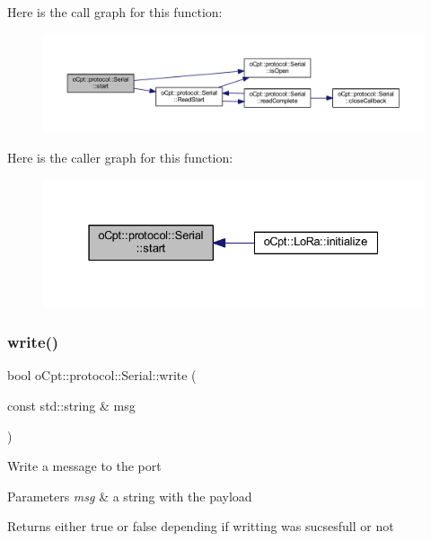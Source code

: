 Here is the call graph for this function\+:\nopagebreak
\begin{figure}[H]
\begin{center}
\leavevmode
\includegraphics[width=350pt]{classo_cpt_1_1protocol_1_1_serial_a6231948447729037b55df7531065749f_cgraph}
\end{center}
\end{figure}
Here is the caller graph for this function\+:\nopagebreak
\begin{figure}[H]
\begin{center}
\leavevmode
\includegraphics[width=331pt]{classo_cpt_1_1protocol_1_1_serial_a6231948447729037b55df7531065749f_icgraph}
\end{center}
\end{figure}
\hypertarget{classo_cpt_1_1protocol_1_1_serial_aa8e04c844af565e2532e771002a5a654}{}\label{classo_cpt_1_1protocol_1_1_serial_aa8e04c844af565e2532e771002a5a654} 
\subsubsection{\texorpdfstring{write()}{write()}\hspace{0.1cm}{\footnotesize\ttfamily [1/2]}}
{\footnotesize\ttfamily bool o\+Cpt\+::protocol\+::\+Serial\+::write (\begin{DoxyParamCaption}\item[{const std\+::string \&}]{msg }\end{DoxyParamCaption})}

Write a message to the port 
\begin{DoxyParams}{Parameters}
{\em msg} & a string with the payload \\
\hline
\end{DoxyParams}
\begin{DoxyReturn}{Returns}
either true or false depending if writting was sucsesfull or not 
\end{DoxyReturn}


